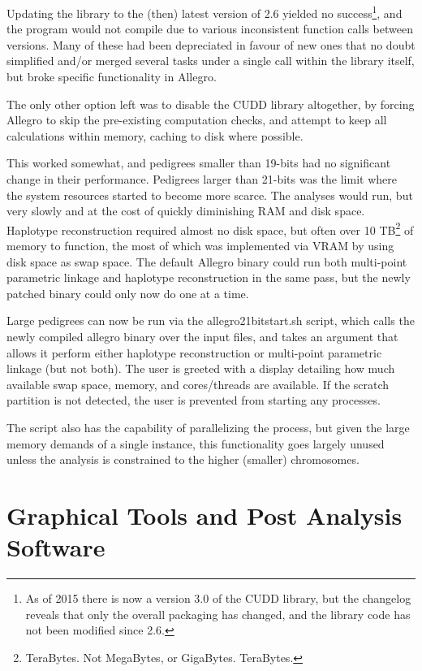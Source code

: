 Updating the library to the (then) latest version of 2.6 yielded no success\footnote{As of 2015 there is now a version 3.0 of the CUDD library, but the changelog  reveals that only the overall packaging has changed, and the library code has not been modified since 2.6.}, and the program would not compile due to various inconsistent function calls between versions. Many of these had been depreciated in favour of new ones that no doubt simplified and/or merged several tasks under a single call within the library itself, but broke specific functionality in Allegro.

The only other option left was to disable the CUDD library altogether, by forcing Allegro to skip the pre-existing computation checks, and attempt to keep all calculations within memory, caching to disk where possible.

This worked somewhat, and pedigrees smaller than 19-bits had no significant change in their performance. Pedigrees larger than 21-bits was the limit where the system resources started to become more scarce. The analyses would run, but very slowly and at the cost of quickly diminishing RAM and disk space. Haplotype reconstruction required almost no disk space, but often over 10 TB\footnote{TeraBytes. Not MegaBytes, or GigaBytes. TeraBytes.} of memory to function, the most of which was implemented via \gls{VRAM} by using disk space as \gls{swap space}. The default Allegro binary could run both multi-point parametric linkage and haplotype reconstruction in the same pass, but the newly patched binary could only now do one at a time.

Large pedigrees can now be run via the \gls{allegro21bitstart.sh} script, which calls  the newly compiled allegro binary over the input files, and takes an argument that allows it perform either haplotype reconstruction or multi-point parametric linkage (but not both). The user is greeted with a display detailing how much available swap space, memory, and cores/threads are available. If the scratch partition is not detected, the user is prevented from starting any processes. 

The script also has the capability of parallelizing the process, but given the large memory demands of a single instance, this functionality goes largely unused unless the analysis is constrained to the higher (smaller) chromosomes. 


\section{Graphical Tools and Post Analysis Software}

